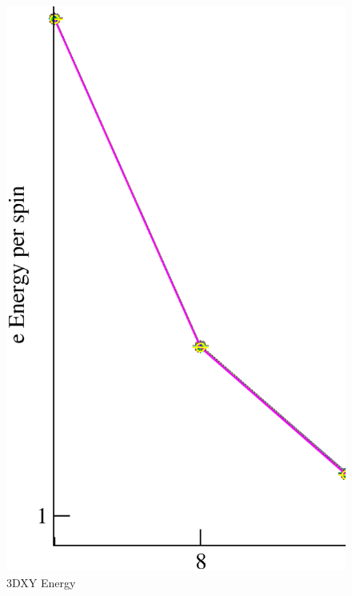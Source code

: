 \begin{figure}[!htpb]
  \centering
  \includegraphics[width=\textwidth]{./plots/3DXY/vsL/Energy.eps}
  \caption{3DXY Energy}
\end{figure}

